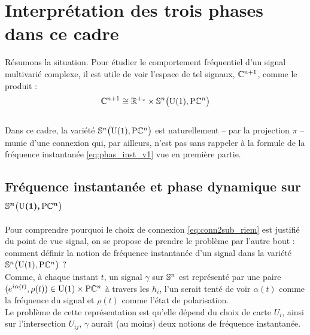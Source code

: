 \section{\wip Interprétation des trois phases dans ce cadre} \label{sec:phases_dans_VFP}

Résumons la situation. Pour étudier le comportement fréquentiel d'un signal multivarié complexe, il est utile de voir l'espace de tel signaux, $\C^{n+1}$, comme le produit :
\[\C^{n+1} \cong \R^{+_*} \times \VFP\]
\\
Dans ce cadre, la variété $\VFP$ est naturellement -- par la projection $\pi$ -- munie d'une connexion qui, par ailleurs, n'est pas sans rappeler à la formule de la fréquence instantanée \eqref{eq:phas_inst_v1} vue en première partie.
\\



\subsection{Fréquence instantanée et phase dynamique sur $\bf{\VFP}$}


Pour comprendre pourquoi le choix de connexion \eqref{eq:conn2sub_riem} est justifié du point de vue signal, on se propose de prendre le problème par l'autre bout : comment définir la notion de fréquence instantanée d'un signal dans la variété $\VFP$ ?
\\
 
Comme, à chaque instant $t$, un signal $\gamma$ sur $\S{n}$ est représenté par une paire $(e^{i\alpha(t)}, \rho(t))\in\U{1}\times\PC{n}$ à travers les $h_i$,  l'un serait tenté de voir $\alpha(t)$ comme la fréquence du signal et $\rho(t)$ comme l'état de polarisation.
\\
Le problème de cette représentation est qu'elle dépend du choix de carte $U_i$, ainsi sur l'intersection $U_{ij}$, $\gamma$ aurait (au moins) deux notions de fréquence instantanée.
\\

